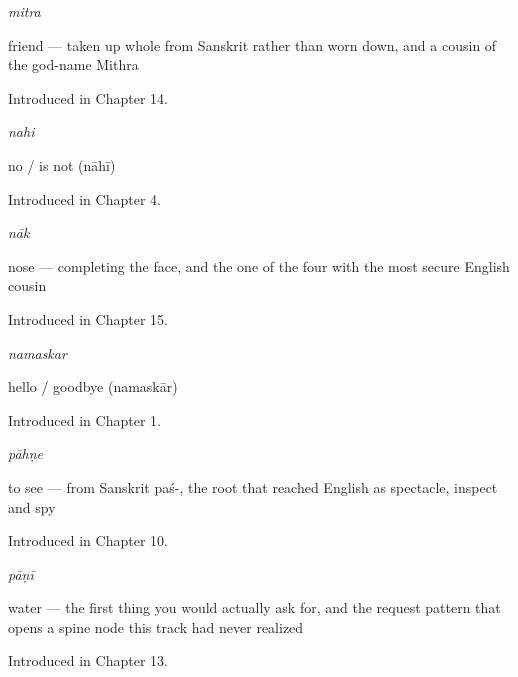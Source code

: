 \noindent\begin{minipage}[t]{\linewidth}
\raggedright
\textbf{}\enspace\emph{mitra}\par
\small friend — taken up whole from Sanskrit rather than worn down, and a cousin of the god-name Mithra\par
\footnotesize Introduced in Chapter 14.
\end{minipage}\par\medskip

\noindent\begin{minipage}[t]{\linewidth}
\raggedright
\textbf{}\enspace\emph{nahi}\par
\small no / is not (nāhī)\par
\footnotesize Introduced in Chapter 4.
\end{minipage}\par\medskip

\noindent\begin{minipage}[t]{\linewidth}
\raggedright
\textbf{}\enspace\emph{nāk}\par
\small nose — completing the face, and the one of the four with the most secure English cousin\par
\footnotesize Introduced in Chapter 15.
\end{minipage}\par\medskip

\noindent\begin{minipage}[t]{\linewidth}
\raggedright
\textbf{}\enspace\emph{namaskar}\par
\small hello / goodbye (namaskār)\par
\footnotesize Introduced in Chapter 1.
\end{minipage}\par\medskip

\noindent\begin{minipage}[t]{\linewidth}
\raggedright
\textbf{}\enspace\emph{pāhṇe}\par
\small to see — from Sanskrit paś-, the root that reached English as spectacle, inspect and spy\par
\footnotesize Introduced in Chapter 10.
\end{minipage}\par\medskip

\noindent\begin{minipage}[t]{\linewidth}
\raggedright
\textbf{}\enspace\emph{pāṇī}\par
\small water — the first thing you would actually ask for, and the request pattern that opens a spine node this track had never realized\par
\footnotesize Introduced in Chapter 13.
\end{minipage}\par\medskip


